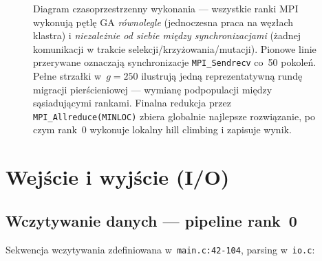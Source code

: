 \documentclass{common/sprawozdanie-agh}
\begin{document}
\begin{figure}[H]
\caption{Diagram czasoprzestrzenny wykonania --- wszystkie ranki MPI wykonują pętlę GA \emph{równolegle} (jednoczesna praca na węzłach klastra) i \emph{niezależnie od siebie między synchronizacjami} (żadnej komunikacji w trakcie selekcji/krzyżowania/mutacji). Pionowe linie przerywane oznaczają synchronizacje \texttt{MPI\_Sendrecv} co~50 pokoleń. Pełne strzałki w~$g=250$ ilustrują jedną reprezentatywną rundę migracji pierścieniowej --- wymianę podpopulacji między sąsiadującymi rankami. Finalna redukcja przez \texttt{MPI\_Allreduce(MINLOC)} zbiera globalnie najlepsze rozwiązanie, po czym rank~0 wykonuje lokalny hill climbing i zapisuje wynik.}
\label{fig:spacetime}
\end{figure}

\section{Wejście i wyjście (I/O)}
\label{sec:io}

\subsection{Wczytywanie danych --- pipeline rank~0}

Sekwencja wczytywania zdefiniowana w~\texttt{main.c:42-104}, parsing w~\texttt{io.c}:
\end{document}
